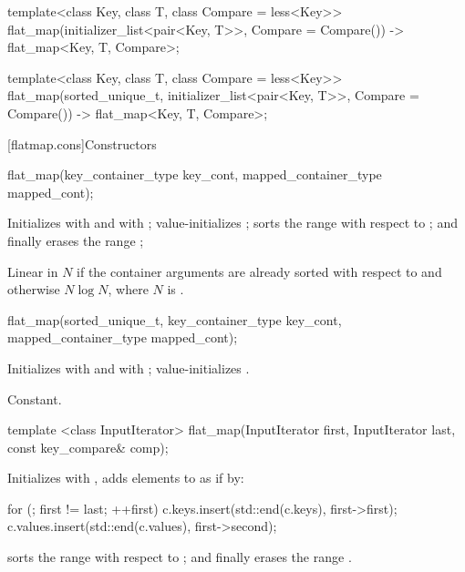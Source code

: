 \begin{addedblock}
\begin{codeblock}
{  template<class Key, class T, class Compare = less<Key>>
    flat_map(initializer_list<pair<Key, T>>, Compare = Compare())
      -> flat_map<Key, T, Compare>;

  template<class Key, class T, class Compare = less<Key>>
  flat_map(sorted_unique_t, initializer_list<pair<Key, T>>, Compare = Compare())
      -> flat_map<Key, T, Compare>;
}
\end{codeblock}

[flatmap.cons]{Constructors}

%
\begin{itemdecl}
flat_map(key_container_type key_cont, mapped_container_type mapped_cont);
\end{itemdecl}

\begin{itemdescr}
\pnum
\effects Initializes  with  and
 with ; value-initializes
; sorts the range  with respect to
; and finally erases the range ;

\pnum
\complexity
Linear in $N$ if the container arguments are already sorted with respect
to  and otherwise $N \log N$, where $N$
is .
\end{itemdescr}

%
\begin{itemdecl}
flat_map(sorted_unique_t, key_container_type key_cont, mapped_container_type mapped_cont);
\end{itemdecl}

\begin{itemdescr}
\pnum
\effects Initializes  with
 and  with
; value-initializes .

\pnum
\complexity
Constant.
\end{itemdescr}

%
\begin{itemdecl}
template <class InputIterator>
  flat_map(InputIterator first, InputIterator last, const key_compare& comp);
\end{itemdecl}

\begin{itemdescr}
\pnum
\effects Initializes  with , adds elements to
 as if by:
\begin{codeblock}
for (; first != last; ++first) {
  c.keys.insert(std::end(c.keys), first->first);
  c.values.insert(std::end(c.values), first->second);
}
\end{codeblock}
sorts the range  with respect to ; and
finally erases the range .


\end{itemdescr}
\end{addedblock}
